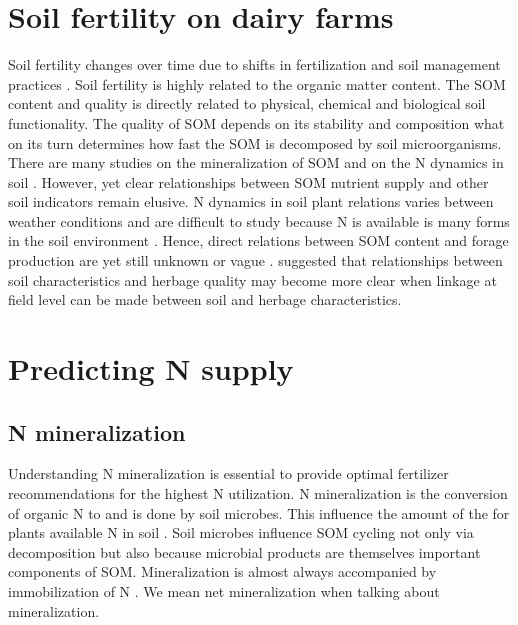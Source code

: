 \documentclass[10pt,twoside,dutch,english]{report}
\begin{document}
\section{Soil fertility on dairy farms} 
Soil fertility changes over time due to shifts in fertilization and soil management practices \citep{Hanegraaf2009}. Soil fertility is highly related to the organic matter content. The SOM content and quality is directly related to physical, chemical and biological soil functionality. The quality of SOM depends on its stability and composition what on its turn determines how fast the SOM is decomposed by soil microorganisms. There are many studies on the mineralization of SOM and on the N dynamics in soil \citep{Wander2004, Haynes2005, Ros2011}. However, yet clear relationships between SOM nutrient supply and other soil indicators remain elusive. N dynamics in soil plant relations varies between weather conditions and are difficult to study because N is available is many forms in the soil environment \citep{Nannipieri2009}. Hence, direct relations between SOM content and forage production are yet still unknown or vague \citep{Hanegraaf2009}. \citet{Reijneveld2014} suggested that relationships between soil characteristics and herbage quality may become more clear when linkage at field level can be made between soil and herbage characteristics. 

\section{Predicting N supply }
\subsection{N mineralization}
Understanding N mineralization is essential to provide optimal fertilizer recommendations for the highest N utilization. N mineralization is the conversion of organic N to  and is done by soil microbes.  This influence the amount of the for plants available N in soil \citep{Myrold2008, Geisseler2010}. Soil microbes influence SOM cycling not only via decomposition but also because microbial products are themselves important components of SOM. Mineralization is almost always accompanied by immobilization of N \citep{Powlson1993}. We mean net mineralization when talking about mineralization. 
\end{document}
